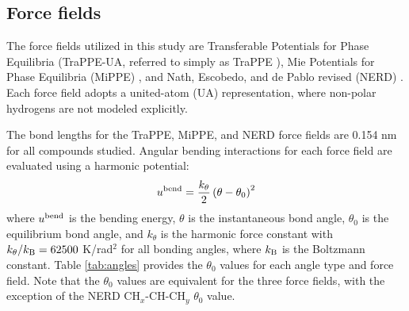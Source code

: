 \documentclass[journal=jced,manuscript=article]{achemso}
\begin{document}
\subsection{Force fields} \label{sec: Force fields}

    The force fields utilized in this study are Transferable Potentials for Phase Equilibria (TraPPE-UA, referred to simply as TraPPE \cite{TraPPE,Martin1999,Keasler2012}), Mie Potentials for Phase Equilibria (MiPPE) \cite{Mie,Potoff_branched,Barhaghi2017}, and Nath, Escobedo, and de Pablo revised (NERD) \cite{NERD,Nath2001}. Each force field adopts a united-atom (UA) representation, where non-polar hydrogens are not modeled explicitly. 
    
    
    The bond lengths for the TraPPE, MiPPE, and NERD force fields are 0.154 nm for all compounds studied. Angular bending interactions for each force field are evaluated using a harmonic potential:
    \begin{equation}
    u^{\rm bend} = \frac{k_\theta}{2} \left(\theta-\theta_0\right)^2
    \end{equation}
    where $u^{\rm bend}$ is the bending energy, $\theta$ is the instantaneous bond angle, $\theta_0$ is the equilibrium bond angle, and $k_\theta$ is the harmonic force constant with $k_\theta/k_{\rm B} = 62500$ K/rad$^2$ for all bonding angles, where $k_{\rm B}$ is the Boltzmann constant. Table \ref{tab:angles} provides the $\theta_0$ values for each angle type and force field. Note that the $\theta_0$ values are equivalent for the three force fields, with the exception of the NERD CH$_x$-CH-CH$_y$ $\theta_0$ value. 
    
\end{document}
